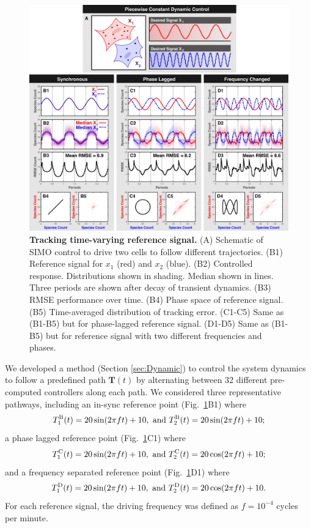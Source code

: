 \documentclass[12pt]{iopart}
\begin{document}
\begin{figure}
\begin{center}
\includegraphics[width=1\textwidth]{DynamicControl.pdf}
\vspace{-0.1in}
\caption{{\bf Tracking time-varying reference signal.}
(A) Schematic of SIMO control to drive two cells to follow different trajectories.
(B1) Reference signal for $x_1$ (red) and $x_2$ (blue).
(B2) Controlled response. Distributions shown in shading. Median shown in lines. Three periods are shown after decay of transient dynamics.
(B3) RMSE performance over time.
(B4) Phase space of reference signal.
(B5) Time-averaged distribution of tracking error.
(C1-C5) Same as (B1-B5) but for phase-lagged reference signal.
(D1-D5) Same as (B1-B5) but for reference signal with two different frequencies and phases.}
\label{CR}
\end{center}
\vspace{-0.2in}
\end{figure}

We developed a method (Section \ref{sec:Dynamic}) to control the system dynamics to follow a predefined path $\mathbf{T}(t)$ by alternating between 32 different pre-computed controllers along each path. We considered three representative pathways, including an in-sync reference point (Fig.\ \ref{CR}B1) where 
$$
T^{\rm B}_1(t) =20 \sin(2 \pi f t)+10,\textrm{ and } T^{\rm B}_2(t) = 20 \sin(2 \pi f t)+10;
$$
a phase lagged reference point (Fig.\ \ref{CR}C1) where
$$
T^{\rm C}_1(t)=20 \sin(2 \pi f t)+10,\textrm{ and } T^{\rm C}_2(t) =20 \cos(2 \pi f t)+10;
$$
and a frequency separated reference point (Fig.\ \ref{CR}D1) where
$$
T^{\rm D}_1(t)=20 \sin(2 \pi f t)+10,\textrm{ and } T^{\rm D}_2(t) =20 \cos(2 \pi f t)+10.
$$
For each reference signal, the driving frequency was defined as $f=10^{-4}$ cycles per minute.
\end{document}

